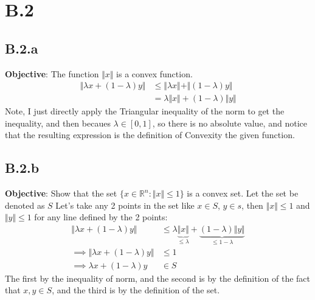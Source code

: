 \documentclass[]{article}
\begin{document}
\section*{B.2}
    \subsection*{B.2.a}
        \textbf{Objective}: The function $\Vert x\Vert$ is a convex function. 
        \begin{align*}\tag{B.2.a.1}\label{eqn:B.2.a.1}
            \Vert \lambda x + (1 - \lambda)y \Vert 
            & \le \Vert \lambda x\Vert + \Vert (1 - \lambda) y\Vert
            \\
            & = \lambda\Vert  x \Vert +  (1 - \lambda)\Vert y\Vert
        \end{align*}
        Note, I just directly apply the Triangular inequality of the norm to get the inequality, and then becaues $\lambda\in[0, 1]$, so there is no absolute value, and notice that the resulting expression is the definition of Convexity the given function.   
    \subsection*{B.2.b}        
        \textbf{Objective}: Show that the set $\{x \in \mathbb{R}^n: \Vert x\Vert \le 1 \}$ is a convex set. Let the set be denoted as $S$ Let's take any 2 points in the set like $x \in S$,  $y \in s$, then $\Vert x\Vert \le 1$ and $\Vert y\Vert\le 1$ for any line defined by the 2 points: 
        \begin{align*}\tag{B.2.b.1}\label{eqn:B.2.b.1}
            \Vert \lambda x + (1 - \lambda)y \Vert &\le 
            \lambda \underbrace{\Vert x\Vert}_{\le \lambda} + \underbrace{(1 - \lambda)\Vert y\Vert}_{\le 1 - \lambda}
            \\
            \implies
            \Vert \lambda x + (1 - \lambda)y \Vert &\le 1
            \\
            \implies \lambda x + (1 - \lambda)y &\in S
        \end{align*}
        The first by the inequality of norm, and the second is by the definition of the fact that $x,y \in S$, and the third is by the definition of the set. 
\end{document}
